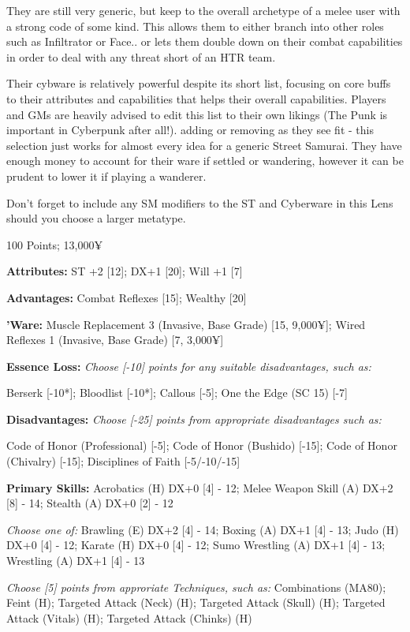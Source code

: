 \begin{multicols}{2}
	They are still very generic, but keep to the overall archetype of a melee user with a strong code of some kind. This allows them to either branch into other roles such as Infiltrator or Face.. or lets them double down on their combat capabilities in order to deal with any threat short of an HTR team.
	
	Their cybware is relatively powerful despite its short list, focusing on core buffs to their attributes and capabilities that helps their overall capabilities. Players and GMs are heavily advised to edit this list to their own likings (The Punk is important in Cyberpunk after all!). adding or removing as they see fit - this selection just works for almost every idea for a generic Street Samurai. They have enough money to account for their ware if settled or wandering, however it can be prudent to lower it if playing a wanderer.
	
	Don't forget to include any SM modifiers to the ST and Cyberware in this Lens should you choose a larger metatype.
	
	\begin{flushright}
		100 Points; 13,000¥
	\end{flushright}
	
	\textbf{Attributes:} ST +2 [12]; DX+1 [20]; Will +1 [7]
	
	\textbf{Advantages:} Combat Reflexes [15]; Wealthy [20]
	
	\textbf{'Ware:}	Muscle Replacement 3 (Invasive, Base Grade) [15, 9,000¥]; Wired Reflexes 1 (Invasive, Base Grade) [7, 3,000¥]
	
	\textbf{Essence Loss:} \textit{Choose [-10] points for any suitable disadvantages, such as:}
	
	Berserk [-10*]; Bloodlist [-10*]; Callous [-5]; One the Edge (SC 15) [-7]
	
	\textbf{Disadvantages:}	\textit{Choose [-25] points from appropriate disadvantages such as:}
	
	Code of Honor (Professional) [-5]; Code of Honor (Bushido) [-15]; Code of Honor (Chivalry) [-15]; Disciplines of Faith [-5/-10/-15]
	
	\textbf{Primary Skills:}
	Acrobatics (H) DX+0 [4] - 12; Melee Weapon Skill (A) DX+2 [8] - 14; Stealth (A) DX+0 [2] - 12
	
	\textit{Choose one of:}
	Brawling (E) DX+2 [4] - 14; Boxing (A) DX+1 [4] - 13; Judo (H) DX+0 [4] - 12; Karate (H) DX+0 [4] - 12; Sumo Wrestling (A) DX+1 [4] - 13; Wrestling (A) DX+1 [4] - 13
		
	\textit{Choose [5] points from approriate Techniques, such as:}
	Combinations (MA80); Feint (H); Targeted Attack (Neck) (H); Targeted Attack (Skull) (H); Targeted Attack (Vitals) (H); Targeted Attack (Chinks) (H)
		

\end{multicols}
